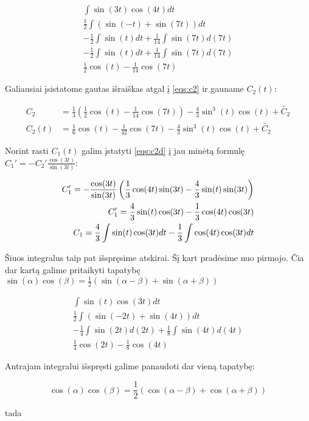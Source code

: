 \documentclass[11pt]{article}
\begin{document}
\begin{align*}
\int\sin(3t)\cos(4t)dt\\
\frac{1}{2}\int(\sin(-t)+\sin(7t))dt\\
-\frac{1}{2}\int\sin(t)dt+\frac{1}{14}\int\sin(7t)d(7t)\\
-\frac{1}{2}\int\sin(t)dt+\frac{1}{14}\int\sin(7t)d(7t)\\
\frac{1}{2}\cos(t)-\frac{1}{14}\cos(7t)
\end{align*}

Galiausiai įsistatome gautas išraiškas atgal į \eqref{eqs:c2} ir gauname $C_2(t)$:

\begin{align*}
C_2&=\frac{1}{3}\left(\frac{1}{2}\cos(t)-\frac{1}{14}\cos(7t)\right)-\frac{4}{3}\sin^3(t)\cos(t)+\tilde{C_2}\\
C_2(t)&=\frac{1}{6}\cos(t)-\frac{1}{42}\cos(7t)-\frac{4}{3}\sin^3(t)\cos(t)+\tilde{C_2}
\end{align*}

Norint rasti $C_1(t)$ galim įstatyti \eqref{eqs:c2d} į jau minėtą formulę $C_1'=-C_2'\frac{\cos(3t)}{\sin(3t)}$:

\begin{align}
C_1'=-\frac{\cos(3t)}{\sin(3t)}\left(\frac{1}{3}\cos(4t)\sin(3t)-\frac{4}{3}\sin(t)\sin(3t)\right)\notag\\
C_1'=\frac{4}{3}\sin(t)\cos(3t)-\frac{1}{3}\cos(4t)\cos(3t) \label{eqs:c1d}\\
C_1=\frac{4}{3}\int\sin(t)\cos(3t)dt-\frac{1}{3}\int\cos(4t)\cos(3t)dt \label{eqs:c1}
\end{align}

Šiuos integralus taip pat išspręsime atskirai. Šį kart pradėsime nuo pirmojo. Čia dar kartą galime pritaikyti 
tapatybę $\sin(\alpha)\cos(\beta)=\frac{1}{2}(\sin(\alpha-\beta)+\sin(\alpha+\beta))$

\begin{align*}
\int\sin(t)\cos(3t)dt\\
\frac{1}{2}\int(\sin(-2t)+\sin(4t))dt\\
-\frac{1}{4}\int\sin(2t)d(2t)+\frac{1}{8}\int\sin(4t)d(4t)\\
\frac{1}{4}\cos(2t)-\frac{1}{8}\cos(4t)
\end{align*}

Antrajam integralui išspręsti galime panaudoti dar vieną tapatybę:

$$\cos(\alpha)\cos(\beta)=\frac{1}{2}(\cos(\alpha-\beta)+\cos(\alpha+\beta))$$

tada
\end{document}
